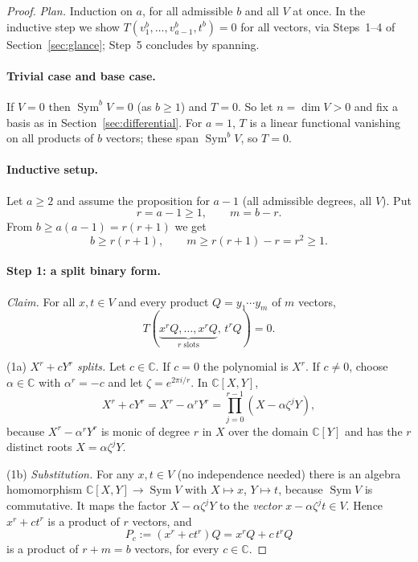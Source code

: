 \documentclass[11pt]{article}
\theoremstyle{remark}
\DeclareMathOperator{\Sym}{Sym}
\newcommand{\C}{\mathbb C}
\begin{document}
\begin{proof}
\emph{Plan.} Induction on $a$, for all admissible $b$ and all $V$ at once.
In the inductive step we show $T(v_1^b,\dots,v_{a-1}^b,t^b)=0$ for all
vectors, via Steps~1--4 of Section~\ref{sec:glance}; Step~5 concludes by
spanning.

\paragraph{Trivial case and base case.}
If $V=0$ then $\Sym^bV=0$ (as $b\ge1$) and $T=0$. So let $n=\dim V>0$ and
fix a basis as in Section~\ref{sec:differential}. For $a=1$, $T$ is a
linear functional vanishing on all products of $b$ vectors; these span
$\Sym^bV$, so $T=0$.

\paragraph{Inductive setup.}
Let $a\ge2$ and assume the proposition for $a-1$ (all admissible degrees,
all $V$). Put
\begin{equation}\label{eq:rm}
 r=a-1\ge1,\qquad m=b-r.
\end{equation}
From $b\ge a(a-1)=r(r+1)$ we get
\begin{equation}\label{eq:range}
 b\ge r(r+1),\qquad m\ge r(r+1)-r=r^2\ge1.
\end{equation}

\paragraph{Step 1: a split binary form.}
\emph{Claim.} For all $x,t\in V$ and every product $Q=y_1\cdots y_m$ of $m$
vectors,
\begin{equation}\label{eq:binary}
 T(\underbrace{x^rQ,\ldots,x^rQ}_{r\text{ slots}},\,t^rQ)=0.
\end{equation}

(1a) \emph{$X^r+cY^r$ splits.} Let $c\in\C$. If $c=0$ the polynomial is
$X^r$. If $c\ne0$, choose $\alpha\in\C$ with $\alpha^r=-c$ and let
$\zeta=e^{2\pi i/r}$. In $\C[X,Y]$,
\[
 X^r+cY^r=X^r-\alpha^rY^r=\prod_{j=0}^{r-1}(X-\alpha\zeta^jY),
\]
because $X^r-\alpha^rY^r$ is monic of degree $r$ in $X$ over the domain
$\C[Y]$ and has the $r$ distinct roots $X=\alpha\zeta^jY$.

(1b) \emph{Substitution.} For any $x,t\in V$ (no independence needed) there
is an algebra homomorphism $\C[X,Y]\to\Sym V$ with $X\mapsto x$,
$Y\mapsto t$, because $\Sym V$ is commutative. It maps the factor
$X-\alpha\zeta^jY$ to the \emph{vector} $x-\alpha\zeta^jt\in V$. Hence
$x^r+ct^r$ is a product of $r$ vectors, and
\[
 P_c:=(x^r+ct^r)Q=x^rQ+c\,t^rQ
\]
is a product of $r+m=b$ vectors, for every $c\in\C$.


\end{proof}
\end{document}
